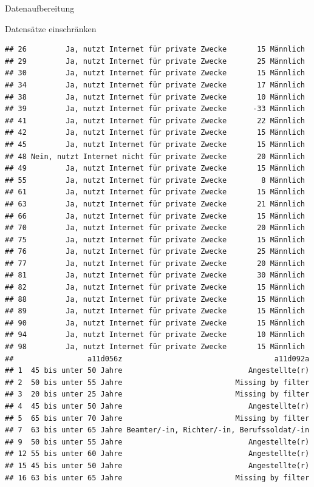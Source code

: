 \documentclass[ignorenonframetext,]{beamer}
\begin{document}
\begin{frame}[fragile]{Datenaufbereitung}
\begin{block}{Datensätze einschränken}
\begin{verbatim}
## 26         Ja, nutzt Internet für private Zwecke       15 Männlich
## 29         Ja, nutzt Internet für private Zwecke       25 Männlich
## 30         Ja, nutzt Internet für private Zwecke       15 Männlich
## 34         Ja, nutzt Internet für private Zwecke       17 Männlich
## 38         Ja, nutzt Internet für private Zwecke       10 Männlich
## 39         Ja, nutzt Internet für private Zwecke      -33 Männlich
## 41         Ja, nutzt Internet für private Zwecke       22 Männlich
## 42         Ja, nutzt Internet für private Zwecke       15 Männlich
## 45         Ja, nutzt Internet für private Zwecke       15 Männlich
## 48 Nein, nutzt Internet nicht für private Zwecke       20 Männlich
## 49         Ja, nutzt Internet für private Zwecke       15 Männlich
## 55         Ja, nutzt Internet für private Zwecke        8 Männlich
## 61         Ja, nutzt Internet für private Zwecke       15 Männlich
## 63         Ja, nutzt Internet für private Zwecke       21 Männlich
## 66         Ja, nutzt Internet für private Zwecke       15 Männlich
## 70         Ja, nutzt Internet für private Zwecke       20 Männlich
## 75         Ja, nutzt Internet für private Zwecke       15 Männlich
## 76         Ja, nutzt Internet für private Zwecke       25 Männlich
## 77         Ja, nutzt Internet für private Zwecke       20 Männlich
## 81         Ja, nutzt Internet für private Zwecke       30 Männlich
## 82         Ja, nutzt Internet für private Zwecke       15 Männlich
## 88         Ja, nutzt Internet für private Zwecke       15 Männlich
## 89         Ja, nutzt Internet für private Zwecke       15 Männlich
## 90         Ja, nutzt Internet für private Zwecke       15 Männlich
## 94         Ja, nutzt Internet für private Zwecke       10 Männlich
## 98         Ja, nutzt Internet für private Zwecke       15 Männlich
##                 a11d056z                                   a11d092a
## 1  45 bis unter 50 Jahre                             Angestellte(r)
## 2  50 bis unter 55 Jahre                          Missing by filter
## 3  20 bis unter 25 Jahre                          Missing by filter
## 4  45 bis unter 50 Jahre                             Angestellte(r)
## 5  65 bis unter 70 Jahre                          Missing by filter
## 7  63 bis unter 65 Jahre Beamter/-in, Richter/-in, Berufssoldat/-in
## 9  50 bis unter 55 Jahre                             Angestellte(r)
## 12 55 bis unter 60 Jahre                             Angestellte(r)
## 15 45 bis unter 50 Jahre                             Angestellte(r)
## 16 63 bis unter 65 Jahre                          Missing by filter

\end{verbatim}
\end{block}
\end{frame}
\end{document}
